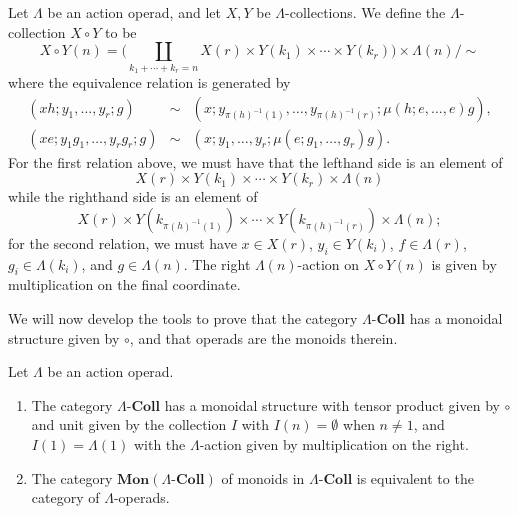 \documentclass{amsbook} %
\newcommand{\mb}{\mathbf}
\numberwithin{section}{chapter}
\begin{document}
\begin{Defi}
Let $\Lambda$ be an action operad, and let $X, Y$ be $\Lambda$-collections.  We define the $\Lambda$-collection $X \circ Y$ to be
\[
X \circ Y (n) = \Big( \coprod_{k_{1} + \cdots + k_{r} = n} X(r) \times Y(k_{1}) \times \cdots \times Y(k_{r}) \Big) \times \Lambda(n) / \sim
\]
where the equivalence relation is generated by
\[
\begin{array}{rcl}
(xh; y_{1}, \ldots, y_{r}; g) & \sim & (x; y_{\pi(h)^{-1}(1)}, \ldots, y_{\pi(h)^{-1}(r)}; \mu(h; e, \ldots, e)g), \\
(xe; y_{1}g_{1}, \ldots, y_{r}g_{r}; g) & \sim &  (x; y_{1}, \ldots, y_{r}; \mu(e; g_{1}, \ldots, g_{r})g).
\end{array}
\]
For the first relation above, we must have that the lefthand side is an element of
\[
X(r) \times Y(k_1) \times \cdots \times Y(k_r) \times \Lambda(n)\]
while the righthand side is an element of
\[
X(r) \times Y(k_{\pi(h)^{-1}(1)}) \times \cdots \times Y(k_{\pi(h)^{-1}(r)}) \times \Lambda(n);
\]
for the second relation, we must have $x \in X(r)$, $y_{i} \in Y(k_{i})$, $f \in \Lambda(r)$, $g_{i} \in \Lambda(k_{i})$, and $g \in \Lambda(n)$.  The right $\Lambda(n)$-action on $X \circ Y(n)$ is given by multiplication on the final coordinate.
\end{Defi}


We will now develop the tools to prove that the category $\Lambda\mb{\mbox{-}Coll}$ has a monoidal structure given by $\circ$, and that operads are the monoids therein.

\begin{thm}\label{operad=monoid}
Let $\Lambda$ be an action operad.
\begin{enumerate}
\item The category $\Lambda\mb{\mbox{-}Coll}$ has a monoidal structure with tensor product given by $\circ$ and unit given by the collection $I$ with $I(n) = \emptyset$ when $n \neq 1$, and $I(1) = \Lambda(1)$ with the $\Lambda$-action given by multiplication on the right.
\item The category $\mb{Mon}(\Lambda\mb{\mbox{-}Coll})$ of monoids in $\Lambda\mb{\mbox{-}Coll}$ is equivalent to the category of $\Lambda$-operads.
\end{enumerate}
\end{thm}
\end{document}
